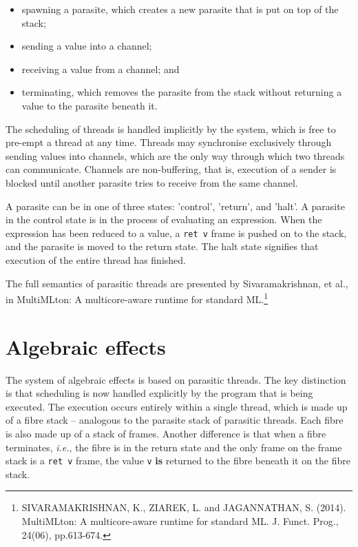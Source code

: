 \documentclass[12pt,a4paper,twoside,openright]{report}
\begin{document}
\begin{itemize}
\item spawning a parasite, which creates a new parasite that is put on top of the stack; 
\item sending a value into a channel;
\item receiving a value from a channel; and 
\item terminating, which removes the parasite from the stack without returning a value to the parasite beneath it.
\end{itemize}

The scheduling of threads is handled implicitly by the system, which is free to pre-empt a thread at any time.  Threads may synchronise exclusively through sending values into channels, which are the only way through which two threads can communicate. Channels are non-buffering, that is, execution of a sender is blocked until another parasite tries to receive from the same channel.

A parasite can be in one of three states: 'control', 'return', and 'halt'. A parasite in the control state is in the process of evaluating an expression. When the expression has been reduced to a value, a \texttt{ret v} frame is pushed on to the stack, and the parasite is moved to the return state. The halt state signifies that execution of the entire thread has finished.

The full semantics of parasitic threads are presented by Sivaramakrishnan, et al., in MultiMLton: A multicore-aware runtime for standard ML.\footnote{SIVARAMAKRISHNAN, K., ZIAREK, L. and JAGANNATHAN, S. (2014). MultiMLton: A multicore-aware runtime for standard ML. J. Funct. Prog., 24(06), pp.613-674.}

\section{Algebraic effects}

The system of algebraic effects is based on parasitic threads. The key distinction is that scheduling is now handled explicitly by the program that is being executed. The execution occurs entirely within a single thread, which is made up of a fibre stack -- analogous to the parasite stack of parasitic threads. Each fibre is also made up of a stack of frames. Another difference is that when a fibre terminates, \textit{i.e.}, the fibre is in the return state and the only frame on the frame stack is a \texttt{ret v} frame, the value \texttt{v} \textbf{is} returned to the fibre beneath it on the fibre stack.
\end{document}
